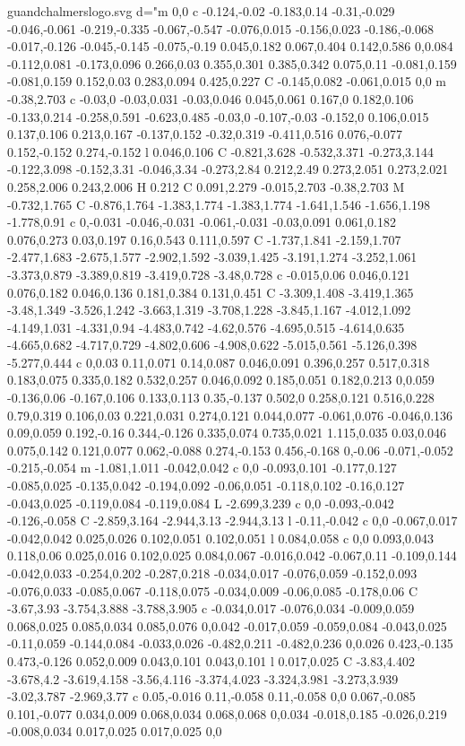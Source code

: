 \begin{filecontents}[noheader]{guandchalmerslogo.svg}
			   d="m 0,0 c -0.124,-0.02 -0.183,0.14 -0.31,-0.029 -0.046,-0.061 -0.219,-0.335 -0.067,-0.547 -0.076,0.015 -0.156,0.023 -0.186,-0.068 -0.017,-0.126 -0.045,-0.145 -0.075,-0.19 0.045,0.182 0.067,0.404 0.142,0.586 0,0.084 -0.112,0.081 -0.173,0.096 0.266,0.03 0.355,0.301 0.385,0.342 0.075,0.11 -0.081,0.159 -0.081,0.159 0.152,0.03 0.283,0.094 0.425,0.227 C -0.145,0.082 -0.061,0.015 0,0 m -0.38,2.703 c -0.03,0 -0.03,0.031 -0.03,0.046 0.045,0.061 0.167,0 0.182,0.106 -0.133,0.214 -0.258,0.591 -0.623,0.485 -0.03,0 -0.107,-0.03 -0.152,0 0.106,0.015 0.137,0.106 0.213,0.167 -0.137,0.152 -0.32,0.319 -0.411,0.516 0.076,-0.077 0.152,-0.152 0.274,-0.152 l 0.046,0.106 C -0.821,3.628 -0.532,3.371 -0.273,3.144 -0.122,3.098 -0.152,3.31 -0.046,3.34 -0.273,2.84 0.212,2.49 0.273,2.051 0.273,2.021 0.258,2.006 0.243,2.006 H 0.212 C 0.091,2.279 -0.015,2.703 -0.38,2.703 M -0.732,1.765 C -0.876,1.764 -1.383,1.774 -1.383,1.774 -1.641,1.546 -1.656,1.198 -1.778,0.91 c 0,-0.031 -0.046,-0.031 -0.061,-0.031 -0.03,0.091 0.061,0.182 0.076,0.273 0.03,0.197 0.16,0.543 0.111,0.597 C -1.737,1.841 -2.159,1.707 -2.477,1.683 -2.675,1.577 -2.902,1.592 -3.039,1.425 -3.191,1.274 -3.252,1.061 -3.373,0.879 -3.389,0.819 -3.419,0.728 -3.48,0.728 c -0.015,0.06 0.046,0.121 0.076,0.182 0.046,0.136 0.181,0.384 0.131,0.451 C -3.309,1.408 -3.419,1.365 -3.48,1.349 -3.526,1.242 -3.663,1.319 -3.708,1.228 -3.845,1.167 -4.012,1.092 -4.149,1.031 -4.331,0.94 -4.483,0.742 -4.62,0.576 -4.695,0.515 -4.614,0.635 -4.665,0.682 -4.717,0.729 -4.802,0.606 -4.908,0.622 -5.015,0.561 -5.126,0.398 -5.277,0.444 c 0,0.03 0.11,0.071 0.14,0.087 0.046,0.091 0.396,0.257 0.517,0.318 0.183,0.075 0.335,0.182 0.532,0.257 0.046,0.092 0.185,0.051 0.182,0.213 0,0.059 -0.136,0.06 -0.167,0.106 0.133,0.113 0.35,-0.137 0.502,0 0.258,0.121 0.516,0.228 0.79,0.319 0.106,0.03 0.221,0.031 0.274,0.121 0.044,0.077 -0.061,0.076 -0.046,0.136 0.09,0.059 0.192,-0.16 0.344,-0.126 0.335,0.074 0.735,0.021 1.115,0.035 0.03,0.046 0.075,0.142 0.121,0.077 0.062,-0.088 0.274,-0.153 0.456,-0.168 0,-0.06 -0.071,-0.052 -0.215,-0.054 m -1.081,1.011 -0.042,0.042 c 0,0 -0.093,0.101 -0.177,0.127 -0.085,0.025 -0.135,0.042 -0.194,0.092 -0.06,0.051 -0.118,0.102 -0.16,0.127 -0.043,0.025 -0.119,0.084 -0.119,0.084 L -2.699,3.239 c 0,0 -0.093,-0.042 -0.126,-0.058 C -2.859,3.164 -2.944,3.13 -2.944,3.13 l -0.11,-0.042 c 0,0 -0.067,0.017 -0.042,0.042 0.025,0.026 0.102,0.051 0.102,0.051 l 0.084,0.058 c 0,0 0.093,0.043 0.118,0.06 0.025,0.016 0.102,0.025 0.084,0.067 -0.016,0.042 -0.067,0.11 -0.109,0.144 -0.042,0.033 -0.254,0.202 -0.287,0.218 -0.034,0.017 -0.076,0.059 -0.152,0.093 -0.076,0.033 -0.085,0.067 -0.118,0.075 -0.034,0.009 -0.06,0.085 -0.178,0.06 C -3.67,3.93 -3.754,3.888 -3.788,3.905 c -0.034,0.017 -0.076,0.034 -0.009,0.059 0.068,0.025 0.085,0.034 0.085,0.076 0,0.042 -0.017,0.059 -0.059,0.084 -0.043,0.025 -0.11,0.059 -0.144,0.084 -0.033,0.026 -0.482,0.211 -0.482,0.236 0,0.026 0.423,-0.135 0.473,-0.126 0.052,0.009 0.043,0.101 0.043,0.101 l 0.017,0.025 C -3.83,4.402 -3.678,4.2 -3.619,4.158 -3.56,4.116 -3.374,4.023 -3.324,3.981 -3.273,3.939 -3.02,3.787 -2.969,3.77 c 0.05,-0.016 0.11,-0.058 0.11,-0.058 0,0 0.067,-0.085 0.101,-0.077 0.034,0.009 0.068,0.034 0.068,0.068 0,0.034 -0.018,0.185 -0.026,0.219 -0.008,0.034 0.017,0.025 0.017,0.025 0,0 
\end{filecontents}

